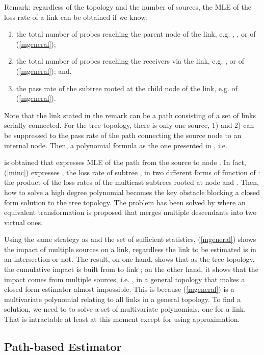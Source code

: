 \documentclass[10pt,twocolumn]{IEEEtran}
\begin{document}
{Remark:} regardless of the topology and the number of sources, the
MLE of the loss rate of a link can be obtained if we know:
\begin{enumerate} \item the total number of probes reaching the parent node of
the link, e.g. , , or  of (\ref{mgeneral});
\item the total number of probes reaching the receivers via
the link, e.g. ,  or  of
(\ref{mgeneral}); and,
\item the pass rate of the subtree rooted at the child node of the link, e.g.  of (\ref{mgeneral}).
\end{enumerate}
Note that the link stated in the remark can be a path consisting of a
set of links serially connected. For the tree topology, there is only
one source, 1) and 2) can be suppressed to the pass rate of the path
connecting the source node to an internal node. Then, a polynomial
formula as the one presented in \cite{CDHT99}, i.e.



\noindent is obtained that expresses MLE of the path from the source
to node . In fact, (\ref{minc}) expresses , the loss
rate of subtree , in two different forms of function of : the
product of the loss rates of the multicast subtrees rooted at node 
and . Then, how to solve a high degree
polynomial becomes the key obstacle blocking a closed form solution to
the tree topology. The problem has been solved by \cite{ZD09} where an
equivalent transformation is proposed that merges multiple descendants
into two virtual ones.

 Using the same strategy as \cite{ZD09} and the set of sufficient statistics, (\ref{mgeneral}) shows the
impact of multiple sources on a link, regardless the link to be
estimated is in an intersection or not. The result, on one hand, shows
that as the tree topology, the cumulative impact is built from
  to link ; on the other hand, it shows that the impact comes from multiple sources, i.e.
 , in a general topology that makes a closed form estimator almost impossible.
 This is because
 (\ref{mgeneral}) is a multivariate polynomial relating to all links in a general topology. To find a solution, we need to
 to solve a set of multivariate polynomials, one for a link. That is
 intractable at least at this moment except for using approximation.

\subsection{Path-based Estimator}
\end{document}
